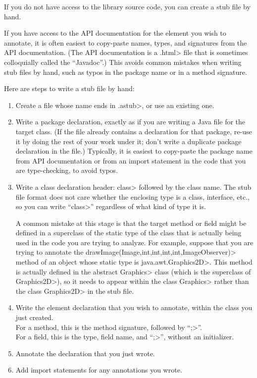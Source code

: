 

If you do not have access to the library source code, you can create a stub
file by hand.

If you have access to the API documentation for the element you wish to
annotate, it is often easiest to copy-paste names, types, and signatures
from the API documentation.  (The API documentation is a \<.html> file that
is sometimes colloquially called the ``Javadoc''.)  This avoids common
mistakes when writing stub files by hand, such as typos in the package name
or in a method signature.


Here are steps to write a stub file by hand:
\begin{enumerate}
\item Create a file whose name ends in \<.astub>, or use an existing one.
\item Write a package declaration, exactly as if you are
writing a Java file for the target class.  (If the file already contains a
declaration for that package, re-use it by doing the rest of your work
under it; don't write a duplicate package declaration in the file.)
Typically, it is easiest to copy-paste the package name from API
documentation or from an import statement in the code that you are
type-checking, to avoid typos.
\item Write a class declaration header:  \<class> followed by the
class name. The stub file format does not care whether the enclosing type
is a class, interface, etc., so you can write ``\<class>'' regardless of
what kind of type it is.

A common mistake at this stage is that the
target method or field might be defined in a superclass of the static type of
the class that is actually being used in the code you are trying to
analyze. For example, suppose that you are trying to annotate the
\<drawImage(Image,int,int,int,int,ImageObserver)> method of an object whose static
type is \<java.awt.Graphics2D>\@.  This method is actually defined in the abstract
\<Graphics> class (which is the superclass of \<Graphics2D>), so it needs
to appear within the class \<Graphics> rather than the class \<Graphics2D>
in the stub file.
\item Write the element declaration that you wish to annotate, within the class you just created.  \\
For a method, this is the method signature, followed by ``\<;>''. \\
For a field, this is the type, field name, and ``\<;>'', without an initializer.
\item Annotate the declaration that you just wrote.
\item Add import statements for any annotations you wrote.
\end{enumerate}

